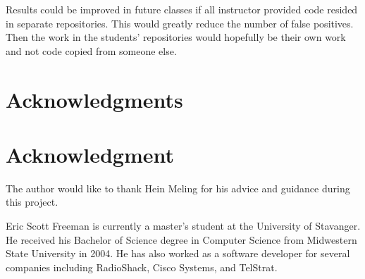 \documentclass[10pt,journal,compsoc]{IEEEtran}
\begin{document}
	Results could be improved in future classes if all instructor provided code resided in separate repositories. This would greatly reduce the number of false positives. Then the work in the students' repositories would hopefully be their own work and not code copied from someone else.
	
	\ifCLASSOPTIONcompsoc
		\section*{Acknowledgments}
	\else
		\section*{Acknowledgment}
	\fi
	
	The author would like to thank Hein Meling for his advice and guidance during this project.
	
	
	

\begin{IEEEbiographynophoto}{Eric Scott Freeman}
is currently a master's student at the University of Stavanger. He received his Bachelor of Science degree in Computer Science from Midwestern State University in 2004. He has also worked as a software developer for several companies including RadioShack, Cisco Systems, and TelStrat.
\end{IEEEbiographynophoto}
\end{document}

